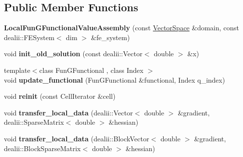 \subsection*{\-Public \-Member \-Functions}
\begin{DoxyCompactItemize}
\item 
\hypertarget{structSpacy_1_1dealII_1_1Detail_1_1LocalFunGFunctionalValueAssembly_3_01dim_00_01Components_00_01id_00_01dim_01_4_ab16ced50ad0c78d033b6c3fa13ea6555}{{\bfseries \-Local\-Fun\-G\-Functional\-Value\-Assembly} (const \hyperlink{classSpacy_1_1VectorSpace}{\-Vector\-Space} \&domain, const dealii\-::\-F\-E\-System$<$ dim $>$ \&fe\-\_\-system)}\label{structSpacy_1_1dealII_1_1Detail_1_1LocalFunGFunctionalValueAssembly_3_01dim_00_01Components_00_01id_00_01dim_01_4_ab16ced50ad0c78d033b6c3fa13ea6555}

\item 
\hypertarget{structSpacy_1_1dealII_1_1Detail_1_1LocalFunGFunctionalValueAssembly_3_01dim_00_01Components_00_01id_00_01dim_01_4_a1393e065f399e11587cb1979b222ebe8}{void {\bfseries init\-\_\-old\-\_\-solution} (const dealii\-::\-Vector$<$ double $>$ \&x)}\label{structSpacy_1_1dealII_1_1Detail_1_1LocalFunGFunctionalValueAssembly_3_01dim_00_01Components_00_01id_00_01dim_01_4_a1393e065f399e11587cb1979b222ebe8}

\item 
\hypertarget{structSpacy_1_1dealII_1_1Detail_1_1LocalFunGFunctionalValueAssembly_3_01dim_00_01Components_00_01id_00_01dim_01_4_a14c4282f2b80cae9fa7f1bab4df5fcb4}{{\footnotesize template$<$class Fun\-G\-Functional , class Index $>$ }\\void {\bfseries update\-\_\-functional} (\-Fun\-G\-Functional \&functional, \-Index q\-\_\-index)}\label{structSpacy_1_1dealII_1_1Detail_1_1LocalFunGFunctionalValueAssembly_3_01dim_00_01Components_00_01id_00_01dim_01_4_a14c4282f2b80cae9fa7f1bab4df5fcb4}

\item 
\hypertarget{structSpacy_1_1dealII_1_1Detail_1_1LocalAssemblyBase_aa626f61838942e829ecd56bcdf00eb36}{void {\bfseries reinit} (const \-Cell\-Iterator \&cell)}\label{structSpacy_1_1dealII_1_1Detail_1_1LocalAssemblyBase_aa626f61838942e829ecd56bcdf00eb36}

\item 
\hypertarget{structSpacy_1_1dealII_1_1Detail_1_1LocalAssemblyBase_a2ed527f94c932b8277010186d3ad1a8d}{void {\bfseries transfer\-\_\-local\-\_\-data} (dealii\-::\-Vector$<$ double $>$ \&gradient, dealii\-::\-Sparse\-Matrix$<$ double $>$ \&hessian)}\label{structSpacy_1_1dealII_1_1Detail_1_1LocalAssemblyBase_a2ed527f94c932b8277010186d3ad1a8d}

\item 
\hypertarget{structSpacy_1_1dealII_1_1Detail_1_1LocalAssemblyBase_a0fa5b7e2be1fbeb8e26f0ea3e755cdd3}{void {\bfseries transfer\-\_\-local\-\_\-data} (dealii\-::\-Block\-Vector$<$ double $>$ \&gradient, dealii\-::\-Block\-Sparse\-Matrix$<$ double $>$ \&hessian)}\label{structSpacy_1_1dealII_1_1Detail_1_1LocalAssemblyBase_a0fa5b7e2be1fbeb8e26f0ea3e755cdd3}

\end{DoxyCompactItemize}
